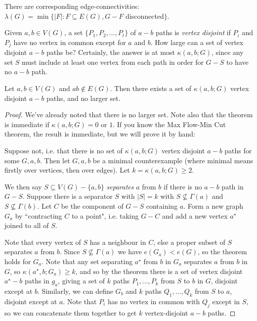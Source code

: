\documentclass[10pt,a4paper]{article}
\begin{document}
There are corresponding edge-connectivities: $\lambda(G) = \min\{|F|:F\subseteq E(G), G-F $ disconnected$\}$.

Given $a,b \in V(G)$, a set $\{P_1, P_2, \ldots, P_t\}$ of $a-b$ paths is \emph{vertex disjoint} if $P_i$ and $P_j$ have no vertex in common except for $a$ and $b$. How large can a set of vertex disjoint $a-b$ paths be? Certainly, the answer is at most $\kappa(a,b;G)$, since any set $S$ must include at least one vertex from each path in order for $G-S$ to have no $a-b$ path.

\begin{theorem}[Menger]
Let $a,b\in V(G)$ and $ab \notin E(G)$. Then there exists a set of $\kappa(a,b;G)$ vertex disjoint $a-b$ paths, and no larger set.
\end{theorem}
\begin{proof}
We've already noted that there is no larger set. Note also that the theorem is immediate if $\kappa(a,b;G) = 0$ or $1$. If you know the Max Flow-Min Cut theorem, the result is immediate, but we will prove it by hand:

Suppose not, i.e. that there is no set of $\kappa(a,b;G)$ vertex disjoint $a-b$ paths for some $G, a, b$. Then let $G, a, b$ be a minimal counterexample (where minimal means firstly over vertices, then over edges). Let $k = \kappa(a,b;G) \geq 2$.

We then say $S \subseteq V(G) - \{a,b\}$ \emph{separates} $a$ from $b$ if there is no $a-b$ path in $G-S$.  Suppose there is a separator $S$ with $|S|=k$ with $S\nsubseteq \Gamma(a)$ and $S \nsubseteq \Gamma(b)$. Let $C$ be the component of $G-S$ containing $a$. Form a new graph $G_a$ by ``contracting $C$ to a point", i.e. taking $G-C$ and add a new vertex $a^\star$ joined to all of $S$.
\begin{center}
\end{center}
Note that every vertex of $S$ has a neighbour in $C$, else a proper subset of $S$ separates $a$ from $b$. Since $S\nsubseteq \Gamma(a)$ we have $e(G_a) < e(G)$, so the theorem holds for $G_a$. Note that any set separating $a^\star$ from $b$ in $G_a$ separates $a$ from $b$ in $G$, so $\kappa(a^\star, b; G_a) \geq k$, and so by the theorem there is a set of vertex disjoint $a^\star-b$ paths in $g_a$, giving a set of $k$ paths $P_1, \ldots, P_k$ from $S$ to $b$ in $G$, disjoint except at $b$. Similarly, we can define $G_b$ and $k$ paths $Q_1, \ldots, Q_k$ from $S$ to $a$, disjoint except at $a$. Note that $P_i$ has no vertex in common with $Q_j$ except in $S$, so we can concatenate them together to get $k$ vertex-disjoint $a-b$ paths.


\end{proof}
\end{document}
